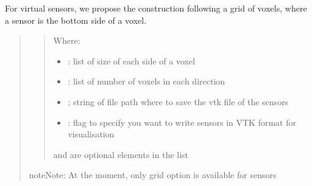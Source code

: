 \documentclass[letterpaper,10pt,english]{sphinxmanual}
\begin{document}
\sphinxAtStartPar
For virtual sensors, we propose the construction following a grid of voxels, where a sensor is the bottom side of a voxel.
\begin{quote}
\begin{quote}

\begin{sphinxVerbatim}[commandchars=\\\{\}]
\PYG{p}{[}\PYG{p}{]}  \PYG{p}{[}     \PYG{p}{]}
\end{sphinxVerbatim}

\sphinxAtStartPar
Where:
\begin{itemize}
\item {} 
\sphinxAtStartPar
{} : list of size of each side of a voxel

\item {} 
\sphinxAtStartPar
{} : list of number of voxels in each direction

\item {} 
\sphinxAtStartPar
{} : string of file path where to save the vtk file of the sensors

\item {} 
\sphinxAtStartPar
{} : flag to specify you want to write sensors in VTK format for visualisation

\end{itemize}

\sphinxAtStartPar
{} and  are optional elements in the list
\end{quote}

\begin{sphinxadmonition}{note}{Note:}
\sphinxAtStartPar
At the moment, only grid option is available for sensors
\end{sphinxadmonition}
\end{quote}
\end{document}
